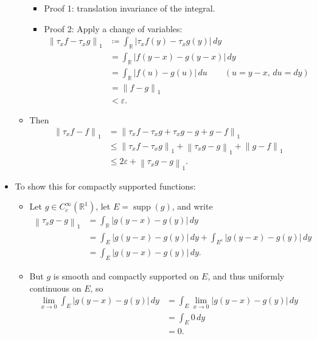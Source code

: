 \begin{solution}
\begin{itemize}
\begin{itemize}
    \begin{itemize}
    \tightlist
    \item
      Proof 1: translation invariance of the integral.
    \item
      Proof 2: Apply a change of variables:
      \begin{align*}  
      {\left\lVert {\tau_x f - \tau_x g} \right\rVert}_1
      &\coloneqq\int_{\mathbb{R}}{\left\lvert {\tau_x f(y) - \tau_x g(y)} \right\rvert}\, dy \\
      &= \int_{\mathbb{R}}{\left\lvert {f(y-x) - g(y-x)} \right\rvert}\, dy  \\
      &= \int_{\mathbb{R}}{\left\lvert {f(u) - g(u)} \right\rvert}\, du \qquad (u=y-x,\, du=dy) \\
      &= {\left\lVert {f-g} \right\rVert}_1 \\
      &< {\varepsilon}
      .\end{align*}
    \end{itemize}
  \item
    Then
    \begin{align*}  
    {\left\lVert {\tau_x f - f} \right\rVert}_1 
    &= {\left\lVert {\tau_x f - \tau_x g + \tau_x g - g +g - f} \right\rVert}_{1} \\
    &\leq {\left\lVert {\tau_x f - \tau_x g} \right\rVert}_1 + {\left\lVert {\tau_x g - g} \right\rVert}_1 + {\left\lVert {g - f} \right\rVert}_{1} \\
    &\leq 2{\varepsilon}+ {\left\lVert {\tau_x g - g} \right\rVert}_1
    .\end{align*}
  \end{itemize}
\item
  To show this for compactly supported functions:

  \begin{itemize}
  \item
    Let \(g\in C_c^\infty({\mathbb{R}}^1)\), let
    \(E = {\operatorname{supp}}(g)\), and write
    \begin{align*}  
    {\left\lVert {\tau_x g - g} \right\rVert}_1 
    &= \int_{\mathbb{R}}{\left\lvert {g(y-x) - g(y)} \right\rvert}\,dy \\
    &= \int_E {\left\lvert {g(y-x) - g(y)} \right\rvert} \,dy + \int_{E^c} {\left\lvert {g(y-x) - g(y)} \right\rvert} \,dy\\
    &= \int_E {\left\lvert {g(y-x) - g(y)} \right\rvert} \,dy 
    .\end{align*}
  \item
    But \(g\) is smooth and compactly supported on \(E\), and thus
    uniformly continuous on \(E\), so
    \begin{align*}  
    \lim_{x\to 0} \int_E {\left\lvert {g(y-x) - g(y)} \right\rvert} \,dy 
    &= \int_E \lim_{x\to 0} {\left\lvert {g(y-x) - g(y)} \right\rvert} \,dy \\
    &= \int_E 0 \,dy \\
    &= 0
    .\end{align*}
  \end{itemize}
\end{itemize}

\end{solution}


